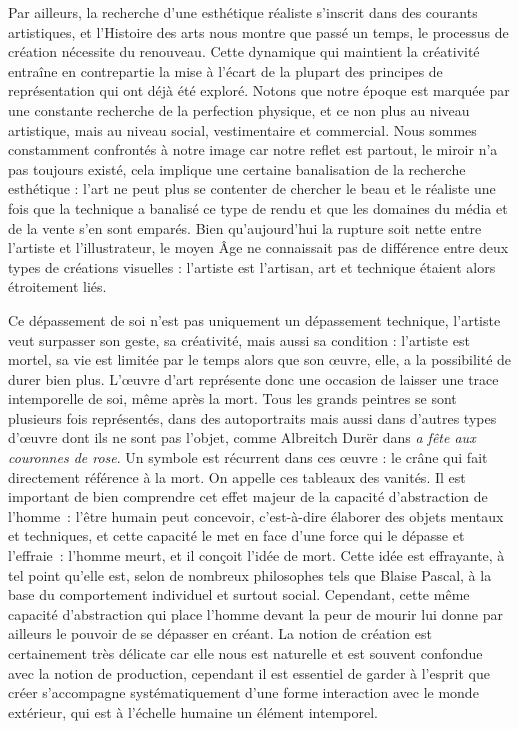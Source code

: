 	Par ailleurs, la recherche d'une esthétique réaliste s'inscrit dans des courants artistiques, et l'Histoire des arts nous montre que  passé un temps, le processus de création nécessite du renouveau. Cette dynamique qui maintient la créativité entraîne en contrepartie la mise à l'écart de la plupart des principes de représentation qui ont déjà été exploré. Notons que  notre époque est marquée par une constante recherche de la perfection physique, et ce non plus au niveau artistique, mais au niveau social, vestimentaire et commercial. Nous sommes constamment confrontés à notre image car notre reflet est partout, le miroir n'a pas toujours existé, cela implique une certaine banalisation de la recherche esthétique : l'art ne peut plus se contenter de chercher le beau et le réaliste une fois que la technique a banalisé ce type de rendu et que les domaines du média et de la vente s'en sont emparés. Bien qu'aujourd'hui la rupture soit nette entre l'artiste et l'illustrateur, le moyen Âge ne connaissait pas de différence entre deux types de créations visuelles : l'artiste est l'artisan, art et technique étaient alors étroitement liés.

\xspace
{}
	Ce dépassement de soi n'est pas uniquement un dépassement technique, l'artiste veut surpasser son geste, sa créativité, mais aussi sa condition : l'artiste est mortel, sa vie est limitée par le temps alors que son \oe{}uvre, elle, a la possibilité de durer bien plus. L'\oe{}uvre d'art représente donc une occasion de laisser une trace intemporelle de soi, même après la mort. Tous les grands peintres se sont plusieurs fois représentés, dans des autoportraits mais aussi dans d'autres types d'\oe{}uvre dont ils ne sont pas l'objet, comme Albreitch Durër dans \emph{a fête aux couronnes de rose}. Un symbole est récurrent dans ces \oe{}uvre : le crâne qui fait directement référence à la mort. On appelle ces tableaux des vanités. Il est important de bien comprendre cet effet majeur de la capacité d’abstraction de l’homme : l’être humain peut concevoir, c'est-à-dire élaborer des objets mentaux et techniques, et cette capacité le met en face d’une force qui le dépasse et l’effraie : l’homme meurt, et il conçoit l’idée de mort. Cette idée est effrayante, à tel point qu’elle est, selon de nombreux philosophes tels que Blaise Pascal, à la base du comportement individuel et surtout social. Cependant, cette même capacité d’abstraction qui place l’homme devant la peur de mourir lui donne par ailleurs le pouvoir de se dépasser en créant. La notion de création est certainement très délicate car elle nous est naturelle et est souvent confondue avec la notion de production, cependant il est essentiel de garder à l’esprit que créer s’accompagne systématiquement d’une forme interaction avec le monde extérieur, qui est à l’échelle humaine un élément intemporel.

